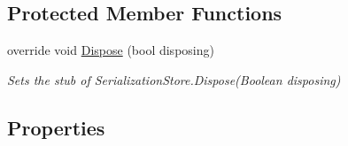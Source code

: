 \subsection*{Protected Member Functions}
\begin{DoxyCompactItemize}
\item 
override void \hyperlink{class_system_1_1_component_model_1_1_design_1_1_serialization_1_1_fakes_1_1_stub_serialization_store_a4218f765c46970daf788ae4c73a22a27}{Dispose} (bool disposing)
\begin{DoxyCompactList}\small\item\em Sets the stub of Serialization\-Store.\-Dispose(\-Boolean disposing)\end{DoxyCompactList}\end{DoxyCompactItemize}
\subsection*{Properties}

